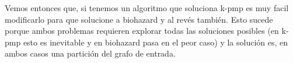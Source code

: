 \documentclass[a4paper]{article}
\begin{document}
\newline Vemos entonces que, si tenemos un algoritmo que soluciona k-pmp es muy facil modificarlo para que solucione a biohazard y al revés también. Esto sucede porque ambos problemas requieren explorar todas las soluciones posibles (en k-pmp esto es inevitable y en biohazard pasa en el peor caso) y la solución es, en ambos casos una partición del grafo de entrada.
\end{document}
